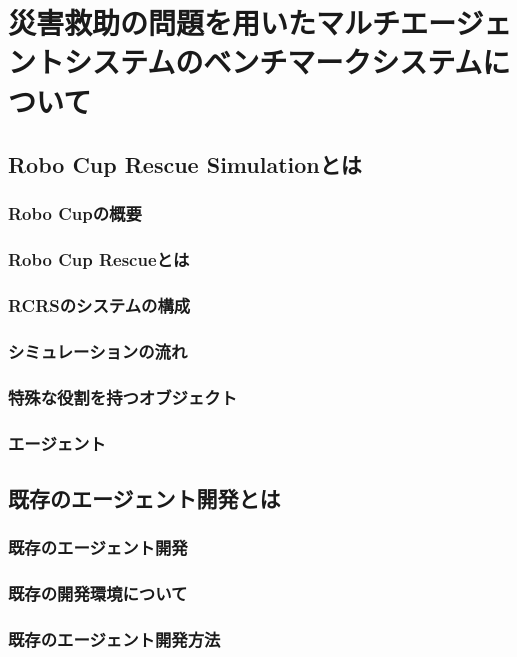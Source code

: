 \newcommand{\RCRS}{Robo Cup Rescue Simulation}

\chapter{災害救助の問題を用いたマルチエージェントシステムのベンチマークシステムについて}

\thispagestyle{myheadings}

\section{\RCRS とは}
\subsection{Robo Cupの概要}
\subsection{Robo Cup Rescueとは}
\subsection{RCRSのシステムの構成}
\subsection{シミュレーションの流れ}
\subsection{特殊な役割を持つオブジェクト}
\subsection{エージェント}


\section{既存のエージェント開発とは}
\subsection{既存のエージェント開発}
\subsection{既存の開発環境について}
\subsection{既存のエージェント開発方法}

